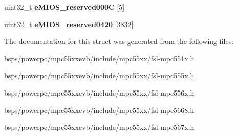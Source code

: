 \begin{DoxyCompactItemize}
\begin{tabbing}
\end{tabbing}\item 
\mbox{\label{structEMIOS__tag_a87c85f7f7d31b65e675bc552a43376e8}} 
uint32\+\_\+t {\bfseries e\+M\+I\+O\+S\+\_\+reserved000C} \mbox{[}5\mbox{]}
\item 
\mbox{\label{structEMIOS__tag_ac642226006ecca755a40be7eff6fdc9b}} 
uint32\+\_\+t {\bfseries e\+M\+I\+O\+S\+\_\+reserved0420} \mbox{[}3832\mbox{]}
\end{DoxyCompactItemize}


The documentation for this struct was generated from the following files\+:\begin{DoxyCompactItemize}
\item 
bsps/powerpc/mpc55xxevb/include/mpc55xx/fsl-\/mpc551x.\+h\item 
bsps/powerpc/mpc55xxevb/include/mpc55xx/fsl-\/mpc555x.\+h\item 
bsps/powerpc/mpc55xxevb/include/mpc55xx/fsl-\/mpc556x.\+h\item 
bsps/powerpc/mpc55xxevb/include/mpc55xx/fsl-\/mpc5668.\+h\item 
bsps/powerpc/mpc55xxevb/include/mpc55xx/fsl-\/mpc567x.\+h\end{DoxyCompactItemize}
